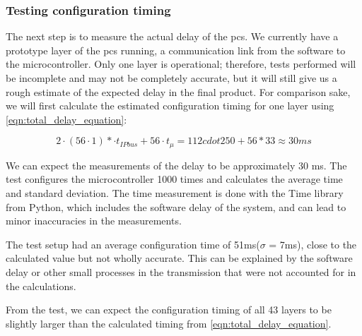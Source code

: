 \documentclass[main.tex]{subfiles}
\begin{document}
\subsubsection{Testing configuration timing}

The next step is to measure the actual delay of the \gls{pcs}. We currently have a prototype layer of the \gls{pcs} running, a communication link from the software to the microcontroller. Only one layer is operational; therefore, tests performed will be incomplete and may not be completely accurate, but it will still give us a rough estimate of the expected delay in the final product. For comparison sake, we will first calculate the estimated configuration timing for one layer using \autoref{eqn:total_delay_equation}:

\begin{equation} \label{eqn:one_layer_delay}
2\cdot(56\cdot1)*\cdot t_{IPbus}+56\cdot t_{\mu }= 112 cdot 250 + 56*33 \approx 30 ms
\end{equation}

We can expect the measurements of the delay to be approximately 30 ms. The test configures the microcontroller 1000 times and calculates the average time and standard deviation. The time measurement is done with the Time library from Python, which includes the software delay of the system, and can lead to minor inaccuracies in the measurements.

The test setup had an average configuration time of 51ms($\sigma$ = 7ms), close to the calculated value but not wholly accurate. This can be explained by the software delay or other small processes in the transmission that were not accounted for in the calculations.

From the test, we can expect the configuration timing of all 43 layers to be slightly larger than the calculated timing from \autoref{eqn:total_delay_equation}.
\end{document}
